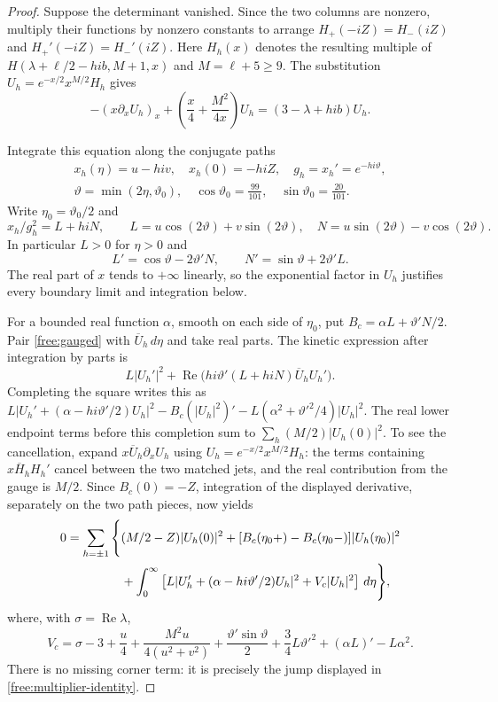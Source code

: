 \begin{proof}
Suppose the determinant vanished.  Since the two columns are nonzero,
multiply their functions by nonzero constants to arrange
$H_+(-iZ)=H_-(iZ)$ and $H_+'(-iZ)=H_-'(iZ)$.
Here $H_h(x)$ denotes the resulting multiple of
$H(\lambda+\ell/2-hi b,M+1,x)$ and $M=\ell+5\ge9$.
The substitution $U_h=e^{-x/2}x^{M/2}H_h$ gives
\begin{equation}\label{free:gauged}
 -(x\partial_xU_h)_x+\left(\frac x4+\frac{M^2}{4x}\right)U_h
 =(3-\lambda+hi b)U_h.
\end{equation}

Integrate this equation along the conjugate paths
\[
 \begin{gathered}
 x_h(\eta)=u-hi v,\quad x_h(0)=-hiZ,\quad
 g_h=x_h'=e^{-hi\vartheta},\\
 \vartheta=\min(2\eta,\vartheta_0),\quad
 \cos\vartheta_0=\frac{99}{101},\quad
 \sin\vartheta_0=\frac{20}{101}.
 \end{gathered}
\]
Write $\eta_0=\vartheta_0/2$ and
\[
 x_h/g_h^2=L+hiN,\qquad
 L=u\cos(2\vartheta)+v\sin(2\vartheta),\quad
 N=u\sin(2\vartheta)-v\cos(2\vartheta).
\]
In particular $L>0$ for $\eta>0$ and
\[
 L'=\cos\vartheta-2\vartheta'N,\qquad
 N'=\sin\vartheta+2\vartheta'L.
\]
The real part of $x$ tends to $+\infty$ linearly, so the exponential
factor in $U_h$ justifies every boundary limit and integration below.

For a bounded real function $\alpha$, smooth on each side of $\eta_0$,
put $B_c=\alpha L+\vartheta'N/2$.  Pair
\eqref{free:gauged} with $\overline U_h\,d\eta$ and take real parts.
The kinetic expression after integration by parts is
\[
 L|U_h'|^2+\operatorname{Re}
 \big(hi\vartheta'(L+hiN)\overline U_hU_h'\big).
\]
Completing the square writes this as
$L|U_h'+(\alpha-hi\vartheta'/2)U_h|^2
-B_c(|U_h|^2)'-L(\alpha^2+\vartheta'^2/4)|U_h|^2$.
The real lower endpoint terms before this completion sum to
$\sum_h(M/2)|U_h(0)|^2$.  To see the cancellation, expand
$x\overline U_h\partial_xU_h$ using $U_h=e^{-x/2}x^{M/2}H_h$:
the terms containing $x\overline H_hH_h'$ cancel between the two
matched jets, and the real contribution from the gauge is $M/2$.
Since $B_c(0)=-Z$, integration of the displayed derivative, separately
on the two path pieces, now yields
\begin{align}\label{free:multiplier-identity}
 0=\sum_{h=\pm1}\Bigg\{&
 (M/2-Z)|U_h(0)|^2+
 [B_c(\eta_0+)-B_c(\eta_0-)]|U_h(\eta_0)|^2\notag\\
 &+\int_0^\infty
 \left[L|U_h'+(\alpha-hi\vartheta'/2)U_h|^2
       +V_c|U_h|^2\right]\,d\eta\Bigg\},
\end{align}
where, with $\sigma=\operatorname{Re}\lambda$,
\begin{equation}\label{free:multiplier-potential}
 V_c=\sigma-3+\frac u4+\frac{M^2u}{4(u^2+v^2)}
 +\frac{\vartheta'\sin\vartheta}{2}
 +\frac34L\vartheta'^2+(\alpha L)'-L\alpha^2.
\end{equation}
There is no missing corner term: it is precisely the jump displayed in
\eqref{free:multiplier-identity}.


\end{proof}
